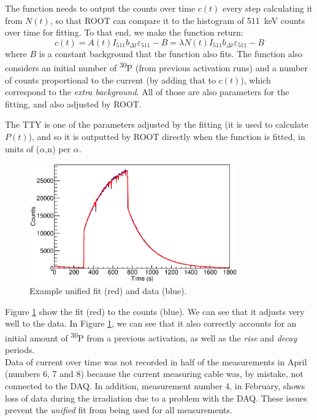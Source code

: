 \documentclass[a4paper,12pt]{report}
\newcommand{\an}{($\alpha$,n) }
\newcommand{\Piso}{\textsuperscript{30}P }
\begin{document}
The function needs to output the counts over time $c(t)$ every step calculating it from $N(t)$, so that ROOT can compare it to the histogram of \qty{511}{\keV} counts over time for fitting.
To that end, we make the function return:
\[ c(t) = A(t)I_{511}b_{\Delta t}\varepsilon_{511} - B = \lambda N(t) I_{511}b_{\Delta t}\varepsilon_{511} - B\]
where $B$ is a constant background that the function also fits.
The function also considers an initial number of \Piso (from previous activation runs) and a number of counts proportional to the current (by adding that to $c(t)$), which correspond to the \textit{extra background}.
All of those are also parameters for the fitting, and also adjusted by ROOT.

The TTY is one of the parameters adjusted by the fitting (it is used to calculate $P(t)$), and so it is outputted by ROOT directly when the function is fitted, in units of \an per $\alpha$.
\\

\begin{figure}[H]
	\centering
	\includegraphics[width=0.80\textwidth]{example_unified_fit.eps}
	\caption{Example unified fit (red) and data (blue).}
	\label{example_unified_fit}
\end{figure}

Figure \ref{example_unified_fit} show the fit (red) to the counts (blue).
We can see that it adjusts very well to the data.
In Figure \ref{example_unified_fit}, we can see that it also correctly accounts for an initial amount of \Piso from a previous activation, as well as the \textit{rise} and \textit{decay} periods.
\\

Data of current over time was not recorded in half of the measurements in April (numbers 6, 7 and 8) because the current measuring cable was, by mistake, not connected to the DAQ.
In addition, measurement number 4, in February, shows loss of data during the irradiation due to a problem with the DAQ.
These issues prevent the \textit{unified} fit from being used for all measurements.
\end{document}
